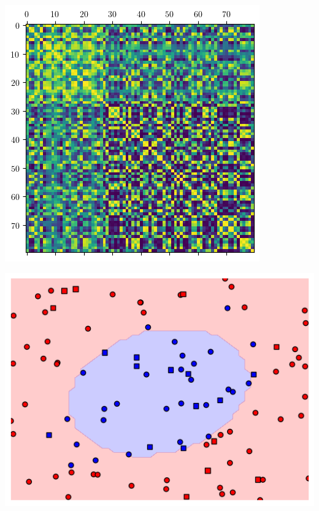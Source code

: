 \documentclass{beamer}
\begin{document}
\begin{frame}
        \pause
        \begin{minipage}{.45\textwidth}
            \centering
            \includegraphics[width=.7\textwidth]{pics/amp-enc-sphere-kernel-matrix.png}
        \end{minipage}
        \begin{minipage}{.45\textwidth}
            \centering
            \includegraphics[width=.8\textwidth]{pics/amp-enc-sphere-envelope.png}
        \end{minipage}
        
    \end{frame}
    
\end{document}
